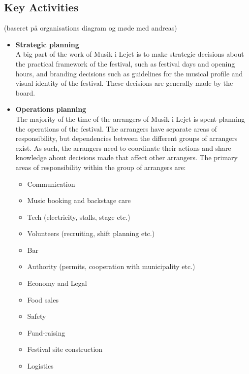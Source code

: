 \subsection{Key Activities} %
\label{sub:key_activities}
(baseret på organisations diagram og møde med andreas)
\begin{itemize}
	\item \textbf{Strategic planning}\\
	A big part of the work of Musik i Lejet is to make strategic decisions about the practical framework of the festival, such as festival days and opening hours, and branding decisions such as guidelines for the musical profile and visual identity of the festival. These decisions are generally made by the board.
	\item \textbf{Operations planning}\\
	The majority of the time of the arrangers of Musik i Lejet is spent planning the operations of the festival. The arrangers have separate areas of responsibility, but dependencies between the different groups of arrangers exist. As such, the arrangers need to coordinate their actions and share knowledge about decisions made that affect other arrangers. The primary areas of responsibility within the group of arrangers are:
	\begin{itemize}
		\item Communication
		\item Music booking and backstage care
		\item Tech (electricity, stalls, stage etc.)
		\item Volunteers (recruiting, shift planning etc.)
		\item Bar
		\item Authority (permits, cooperation with municipality etc.)
		\item Economy and Legal
		\item Food sales
		\item Safety
		\item Fund-raising
		\item Festival site construction
		\item Logistics
	\end{itemize}
\end{itemize}

